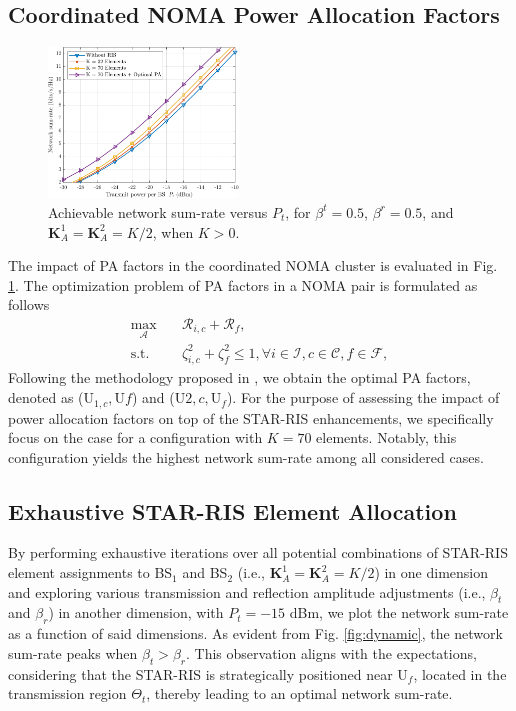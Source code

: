 \documentclass[conference]{IEEEtran}
\begin{document}
\subsection{Coordinated NOMA Power Allocation Factors}
\begin{figure}[t!]
    \centering
    \includegraphics[width=0.45\textwidth]{figs/sumrate.pdf}
    \caption{Achievable network sum-rate versus $P_{t}$, for $\beta^t=0.5$, $\beta^r=0.5$, and $\textbf{K}_A^1=\textbf{K}_A^2=K/2$, when $K > 0$.}
    \label{fig:sumrate}
\end{figure}
The impact of PA factors in the coordinated NOMA cluster is evaluated in Fig. \ref{fig:sumrate}. The optimization problem of PA factors in a NOMA pair is formulated as follows
\begin{align}
\max_{\mathbf{\mathcal{A}}} \quad & \mathcal{R}_{i,c} + \mathcal{R}_{f}, \label{eq:opt2} \\
\textrm{s.t.}
    \quad & \zeta_{i,c}^2 + \zeta_f^2\leq1, \forall i \in \mathcal{I}, c \in \mathcal{C}, f \in \mathcal{F}, \nonumber
\end{align}
Following the methodology proposed in \cite{fang2016energy}, we obtain the optimal PA factors, denoted as (${\text{U}_{1,c}, \text{U}f}$) and (${\text{U}{2,c}, \text{U}_f}$). For the purpose of assessing the impact of power allocation factors on top of the STAR-RIS enhancements, we specifically focus on the case for a configuration with $K=70$ elements. Notably, this configuration yields the highest network sum-rate among all considered cases.

\subsection{Exhaustive STAR-RIS Element Allocation}
By performing exhaustive iterations over all potential combinations of STAR-RIS element assignments to BS$_1$ and BS$_2$ (i.e., $\textbf{K}_A^1=\textbf{K}_A^2=K/2$) in one dimension and exploring various transmission and reflection amplitude adjustments (i.e., $\beta_t$ and $\beta_r$) in another dimension, with $P_t = -15$ dBm, we plot the network sum-rate as a function of said dimensions. As evident from Fig. \ref{fig:dynamic}, the network sum-rate peaks when $\beta_t > \beta_r$. This observation aligns with the expectations, considering that the STAR-RIS is strategically positioned near U$_f$, located in the transmission region $\Theta_t$, thereby leading to an optimal network sum-rate.
\end{document}
